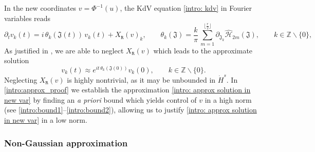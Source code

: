 \documentclass[a4paper,10pt,reqno]{article}
\theoremstyle{definition}
\theoremstyle{plain}
\theoremstyle{plain}
\theoremstyle{definition}
\theoremstyle{plain}
\theoremstyle{plain}
\theoremstyle{plain}
\theoremstyle{definition}
\theoremstyle{definition}
\def \Z{\mathbb Z}
\def \pa{{\partial}}
\def \T{\mathbb{T}}
\def \H{\mathcal{H}}
\begin{document}
In the new coordinates $v = \Phi^{-1}(u)$, the KdV equation \eqref{intro: kdv} in Fourier variables reads
\begin{equation}\label{intro:newdyn}
\partial_t v_k(t) = i\, \theta_k(\mathfrak{J}(t))\, v_k(t) + X_{\mathtt{R}}(v)_k,\qquad \theta_k (\mathfrak{J}) = \frac{k}{\pi}\, \sum_{m=1}^{\lfloor \frac{r}{2}\rfloor} \pa_{\mathfrak{J}_k} \widehat{\H}_{2m}(\mathfrak{J}), \qquad k \in \Z \smallsetminus \{ 0 \},
\end{equation}
As justified in , we are able to neglect $X_{\mathtt{R}}(v)$ which leads to the approximate solution
\begin{equation} \label{intro: approx solution in new var}
v_k(t)\approx e^{i t\,\theta_k(\mathfrak{J}(0))} v_k(0),  \qquad k \in \Z \smallsetminus \{ 0 \}.
\end{equation}
Neglecting $X_{\mathtt{R}}(v)$ is highly nontrivial, as it may be unbounded in $\dot{H}^s$. 
In \eqref{intro:approx_proof} we establish the approximation \eqref{intro: approx solution in new var} by finding an \emph{a priori} bound which yields control of $v$ in a high norm (see \eqref{intro:bound1}--\eqref{intro:bound2}), allowing us to justify \eqref{intro: approx solution in new var} in a low norm.

\subsubsection{Non-Gaussian approximation}
\end{document}
